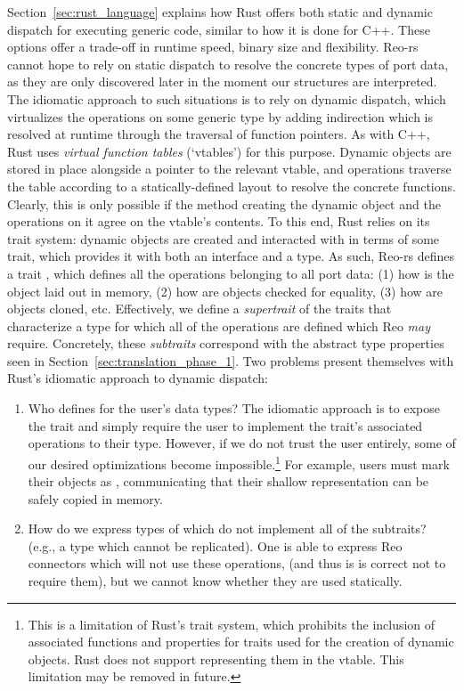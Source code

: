 Section~\ref{sec:rust_language} explains how Rust offers both static and dynamic dispatch for executing generic code, similar to how it is done for C++. These options offer a trade-off in runtime speed, binary size and flexibility. Reo-rs cannot hope to rely on static dispatch to resolve the concrete types of port data, as they are only discovered later in the moment our  structures are interpreted. The idiomatic approach to such situations is to rely on dynamic dispatch, which virtualizes the operations on some generic type by adding indirection which is resolved at runtime through the traversal of function pointers. As with C++, Rust uses \textit{virtual function tables} (`vtables') for this purpose. Dynamic objects are stored in place alongside a pointer to the relevant vtable, and operations traverse the table according to a statically-defined layout to resolve the concrete functions. Clearly, this is only possible if the method creating the dynamic object and the operations on it agree on the vtable's contents. To this end, Rust relies on its trait system: dynamic objects are created and interacted with in terms of some trait, which provides it with both an interface and a type. As such, Reo-rs defines a trait , which defines all the operations belonging to all port data: (1) how is the object laid out in memory, (2) how are objects checked for equality, (3) how are objects cloned, etc. Effectively, we define a \textit{supertrait} of the traits that characterize a type for which all of the operations are defined which Reo \textit{may} require. Concretely, these \textit{subtraits} correspond with the abstract type properties seen in Section~\ref{sec:translation_phase_1}.
Two problems present themselves with Rust's idiomatic approach to dynamic dispatch:
\begin{enumerate}
	\item Who defines  for the user's data types? The idiomatic approach is to expose the trait and simply require the user to implement the trait's associated operations to their type. However, if we do not trust the user entirely, some of our desired optimizations become impossible.\footnote{This is a limitation of Rust's trait system, which prohibits the inclusion of associated functions and properties for traits used for the creation of dynamic objects. Rust does not support representing them in the vtable. This limitation may be removed in future.} For example, users must mark their objects as , communicating that their shallow representation can be safely copied in memory. 
	
	\item How do we express types of  which do not implement all of the subtraits? (e.g., a type which cannot be replicated). One is able to express Reo connectors which will not use these operations, (and thus is is correct not to require them), but we cannot know whether they are used statically.
\end{enumerate}

